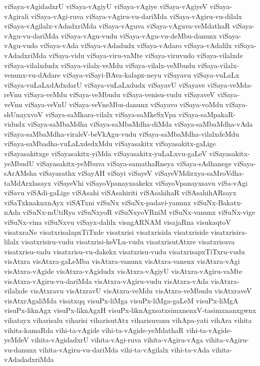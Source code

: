 {viSaya-vAgidadxrU
viSaya-vAgiyU
viSaya-vAgiye
viSaya-vAgiyeV
viSaya-vAgirali
viSaya-vAgi-ruva
viSaya-vAgiru-vu-dariMda
viSaya-vAgiru-vu-dilalx
viSaya-vAgilalx-vAdadxriMda
viSaya-vAguva
viSaya-vAguva-veMdathaR
viSaya-vAgu-vu-dariMda
viSaya-vAgu-vudu
viSaya-vAgu-vu-deMbu-danunx
viSaya-vAgu-vudo
viSaya-vAda
viSaya-vAdadudx
viSaya-vAdaro
viSaya-vAdalilx
viSaya-vAdadxriMda
viSaya-vidu
viSaya-viru-vaMte
viSaya-viruvudo
viSaya-vilalxde
viSaya-vilalxdudx
viSaya-vilalx-veMdu
viSaya-vilalx-veMbudu
viSaya-vilalx-venunx-vu-dAdare
viSaya-viSayi-BAva-kalapx-neyu
viSayavu
viSaya-vuLaLx
viSaya-vuLaLxdAdxdarU
viSaya-vuLaLxdudx
viSayavU
viSayave
viSaya-veMda-reVnu
viSaya-veMdu
viSaya-veMbudu
viSaya-venisu-vudu
viSayaveV
viSaya-veVnu
viSaya-veVnU
viSaya-veVneMbu-danunx
viSayavo
viSaya-voMdu
viSaya-shUnayxvoV
viSaya-saMkara-vilalx
viSaya-saMkeSxVpa
viSaya-saMpakaR-vidudx
viSaya-saMbaMdha
viSaya-saMbaMdha-diMda
viSaya-saMbaMdha-vAda
viSaya-saMbaMdha-viraleV-beVkAgu-vudu
viSaya-saMbaMdha-vilalxdeMdu
viSaya-saMbadha-vuLaLxdedxMdu
viSayasakitx
viSayasakitx-gaLige
viSayasakitxge
viSayasakitx-yiMda
viSayasakitx-yuLaLxvu-gaLeV
viSayasakitx-yeMbudU
viSayasakitx-yeMbuva
viSaya-samathaRneya
viSaya-sAdhanege
viSaya-sArAMsha
viSayasathx
viSayAH
viSayi
viSayeV
viSayeVMdirxya-saMroVdha-taMdArxlasayx
viSayeVhi
viSayoVpanayxsakekx
viSayoVpanayxsavu
viSa-vAgi
viSavu
viSAdi-gaLige
viSAsahi
viSAsahiriti
viSAsahihaR
viSAsahihARsayx
viSaTxknaknxnAyx
viSATxni
viSuNx
viSuNx-padavi-yanunx
viSuNx-Bakatx-nAda
viSuNx-mUtiRya
viSuNxyoR
viSuNxyoVRniM
viSuNx-vanunx
viSuNx-vige
viSuNx-vina
viSuNxvu
viSayx-dalilx
visagARNAM
visajaRna
visukaqtoV
visatxraNe
visatxrisalapxTiTxde
visatxrisi
visatxrisida
visatxriside
visatxrisira-lilalx
visatxrisiru-vudu
visatxrisi-heVLu-vudu
visatxrisutAtxre
visatxrisuva
visatxrisu-vadu
visatxrisu-vu-dakekx
visatxrisu-vudu
visatxrisapxTiTxru-vudu
visAtxra
visAtxra-gaLeMba
visAtxra-vanunx
visAtxra-vanenx
visAtxra-vAgi
visAtxra-vAgide
visAtxra-vAgidudx
visAtxra-vAgiyU
visAtxra-vAgiru-vaMte
visAtxra-vAgiru-vu-dariMda
visAtxra-vAgiru-vudu
visAtxra-vAda
visAtxra-vilalxde
visAtxravu
visAtxravU
visAtxra-veMdu
visAtxra-veMbudu
visAtxraveV
visAtxrAgaliMda
visatxqq
visuPx-liMga
visuPx-liMga-gaLeM
visuPx-liMgA
visuPx-liknAgx
visuPx-liknAgxH
visuPx-liknAgxsatxsimxnenxV-tasimxnanxgwnx
vihatayx
viharisalu
viharisi
viharisutAtx
viharisuvanu
vihApa-yati
vihAra
vihita
vihita-kamaRda
vihi-ta-vAgide
vihi-ta-vAgide-yeMdathaR
vihi-ta-vAgide-yeMdeV
vihita-vAgidadxrU
vihita-vAgi-ruva
vihita-vAgiru-vAga
vihita-vAgiru-vu-danunx
vihita-vAgiru-vu-dariMda
vihi-ta-vAgilalx
vihi-ta-vAda
vihita-vAdadadxriMda
}
